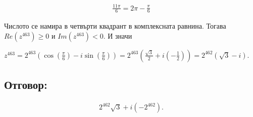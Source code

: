 \documentclass{article}[12pt]
\begin{document}
\begin{align*}
\displaystyle{\frac{11\pi}{6}} = 2\pi -  \displaystyle{\frac{\pi}{6}}
\end{align*}

Числото се намира в четвърти квадрант в комплексната равнина.
Тогава \(Re(z^{463}) \geq 0\) и \(Im(z^{463}) < 0\). И значи

\(z^{463} = 2^{463}\left(\cos\left(\displaystyle{\frac{\pi}{6}}\right) - i\sin\left(\displaystyle{\frac{\pi}{6}}\right)\right) =
2^{463}\left(\displaystyle{\frac{\sqrt{3}}{2}} + i\left(-\displaystyle{\frac{1}{2}}\right)\right) = 2^{462}(\sqrt{3} - i)\).

\subsection*{Отговор:}

\begin{align*}
2^{462}\sqrt{3} + i(-2^{462}).
\end{align*}
\end{document}
